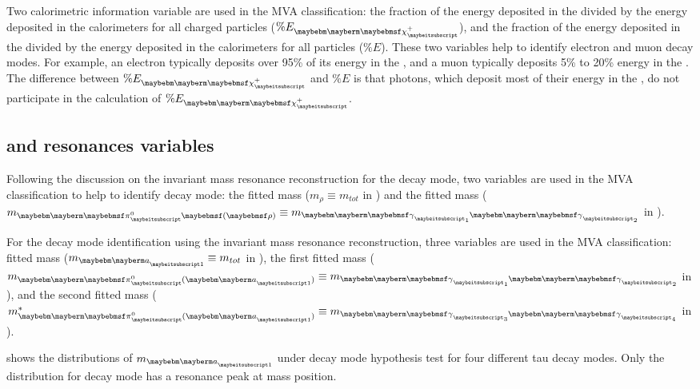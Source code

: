 Two calorimetric information variable are used in the MVA classification: the fraction of the energy  deposited in the \ECAL divided by the  energy deposited in the calorimeters for all charged particles ($\% E_{\charge}$), and the fraction of the energy  deposited in the \ECAL divided by the  energy deposited in the calorimeters for all particles ($\% E$). These  two variables help to identify electron and muon decay modes. For example, an electron typically deposits over 95\% of its energy in the \ECAL, and a muon typically deposits 5\% to 20\% energy in the \ECAL. The difference between $\% E_{\charge}$ and  $\% E$ is that photons, which deposit most of their energy in the \ECAL, do not participate in the calculation of $\% E_{\charge}$.

\subsection{\texorpdfstring{\decayRhoShort and \decayAiPhotonShort} \, resonances variables}

Following the discussion on the \Prho invariant mass resonance reconstruction for the \decayRhoShort  decay mode,  two variables are used in the MVA classification to help to identify  \decayRhoShort  decay mode: the fitted \Prho mass ($m_\rho \equiv m_{tot}$ in ) and the fitted \Ppizero mass ($m_{\Pgpz\parenths{\rho}} \equiv m_{\Pphoton_1\Pphoton_2}$ in  ).

For the \decayAiPhotonShort decay mode identification using the \Pai invariant mass resonance reconstruction, three variables are used in the MVA classification:  fitted \Pai mass ($m_{\Pai} \equiv m_{tot}$ in ), the first fitted \Ppizero mass ($m_{\Pgpz(\Pai)} \equiv m_{\Pphoton_1\Pphoton_2}$ in ), and the second fitted \Ppizero mass ($m^*_{\Pgpz(\Pai)} \equiv  m_{\Pphoton_3\Pphoton_4}$ in ).

  shows the distributions of  $m_{\Pai}$ under \decayAiPhotonShort decay mode hypothesis test for four different tau decay modes. Only the distribution for \decayAiPhotonShort decay mode has a resonance peak at \Pai mass position.


